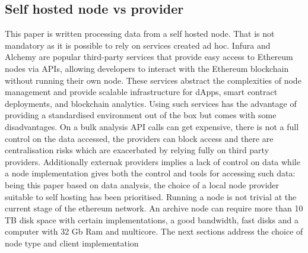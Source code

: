 \documentclass[11pt,a4paper,titlepage]{scrartcl}
\begin{document}
\subsection {Self hosted node vs provider}
This paper is written processing data from a self hosted node. That is not mandatory as it is possible to rely on services created ad hoc. Infura and Alchemy are popular third-party services that provide easy access to Ethereum nodes via APIs, allowing developers to interact with the Ethereum blockchain without running their own node. These services abstract the complexities of node management and provide scalable infrastructure for dApps, smart contract deployments, and blockchain analytics.
Using such services has the advantage of providing a standardised environment out of the box but comes with some disadvantages. On a bulk analysis API calls can get expensive, there is not a full control on the data accessed, the providers can block access and there are centralisation risks which are exacerbated by relying fully on third party providers.
Additionally externak providers implies  a lack of control on data while a node implementation gives both the control and tools for accessing such data: being this paper based on data analysis, the choice of a local node provider suitable to self hosting has been prioritised.
Running a node is not  trivial at the current stage of the ethereum network. An archive node can require more than 10 TB disk space with certain implementations, a good bandwidth, fast disks and a computer with 32 Gb Ram and multicore.
The next sections address the choice of node type and client implementation

\begin{table}[ht]
\centering
\caption{Main characteristic Alchemy and Infura}
\label{tab:alchemy_vs_infura}
\end{table}
\end{document}
